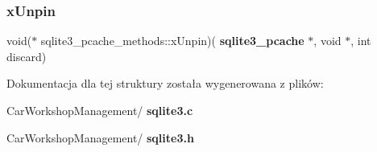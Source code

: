 \mbox{\label{structsqlite3__pcache__methods_ade2ab50cc6896be03ee86541877fa85e}} 
\subsubsection{xUnpin}
{\footnotesize\ttfamily void($\ast$ sqlite3\+\_\+pcache\+\_\+methods\+::x\+Unpin)(\textbf{ sqlite3\+\_\+pcache} $\ast$, void $\ast$, int discard)}



Dokumentacja dla tej struktury została wygenerowana z plików\+:\begin{DoxyCompactItemize}
\item 
Car\+Workshop\+Management/\textbf{ sqlite3.\+c}\item 
Car\+Workshop\+Management/\textbf{ sqlite3.\+h}\end{DoxyCompactItemize}
